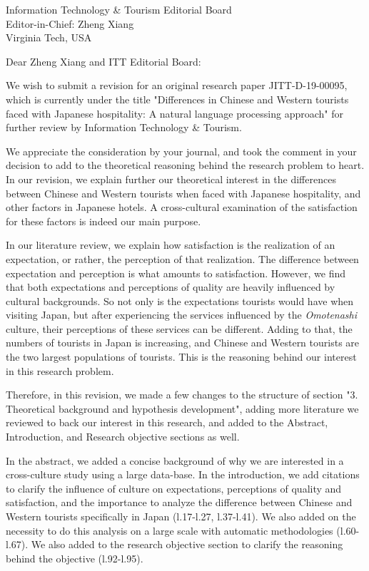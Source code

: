 \documentclass{letter}
\begin{document}
\begin{letter}{
Information Technology \& Tourism Editorial Board \\
Editor-in-Chief:  Zheng Xiang\\
Virginia Tech, USA}

\opening{Dear Zheng Xiang and ITT Editorial Board:}

We wish to submit a revision for an original research paper JITT-D-19-00095, which is currently under the title "Differences in Chinese and Western tourists faced with Japanese hospitality: A natural language processing approach" for further review by Information Technology \& Tourism.

We appreciate the consideration by your journal, and took the comment in your decision to add to the theoretical reasoning behind the research problem to heart. In our revision, we explain further our theoretical interest in the differences between Chinese and Western tourists when faced with Japanese hospitality, and other factors in Japanese hotels. A cross-cultural examination of the satisfaction for these factors is indeed our main purpose. 

In our literature review, we explain how satisfaction is the realization of an expectation, or rather, the perception of that realization. The difference between expectation and perception is what amounts to satisfaction. However, we find that both expectations and perceptions of quality are heavily influenced by cultural backgrounds. So not only is the expectations tourists would have when visiting Japan, but after experiencing the services influenced by the \textit{Omotenashi} culture, their perceptions of these services can be different. Adding to that, the numbers of tourists in Japan is increasing, and Chinese and Western tourists are the two largest populations of tourists. This is the reasoning behind our interest in this research problem. 

Therefore, in this revision, we made a few changes to the structure of section "3. Theoretical background and hypothesis development", adding more literature we reviewed to back our interest in this research, and added to the Abstract, Introduction, and Research objective sections as well.

In the abstract, we added a concise background of why we are interested in a cross-culture study using a large data-base. In the introduction, we add citations to clarify the influence of culture on expectations, perceptions of quality and satisfaction, and the importance to analyze the difference between Chinese and Western tourists specifically in Japan (l.17-l.27, l.37-l.41). We also added on the necessity to do this analysis on a large scale with automatic methodologies (l.60-l.67). We also added to the research objective section to clarify the reasoning behind the objective (l.92-l.95). 


\end{letter}
\end{document}
